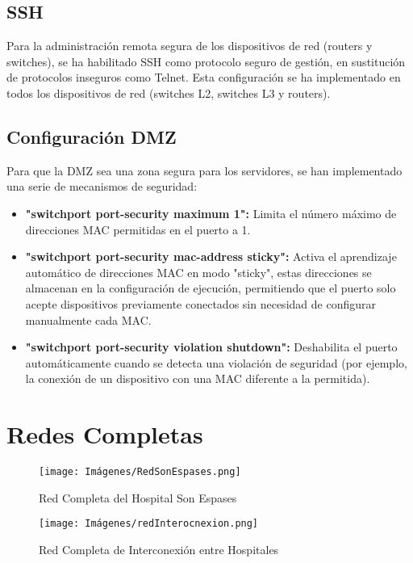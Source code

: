 \subsection{SSH}
Para la administración remota segura de los dispositivos de red (routers y switches), se ha habilitado SSH como protocolo seguro de gestión, en sustitución de protocolos inseguros como Telnet. 
Esta configuración se ha implementado en todos los dispositivos de red (switches L2, switches L3 y routers). 

\subsection{Configuración DMZ}
Para que la DMZ sea una zona segura para los servidores, se han implementado una serie de mecanismos de seguridad:
\begin{itemize}
    \item \textbf{"switchport port-security maximum 1":} Limita el número máximo de direcciones MAC permitidas en el puerto a 1.
    \item \textbf{"switchport port-security mac-address sticky":} Activa el aprendizaje automático de direcciones MAC en modo "sticky", estas direcciones se almacenan en la configuración de ejecución, permitiendo que el puerto solo acepte dispositivos previamente conectados sin necesidad de configurar manualmente cada MAC.
    \item \textbf{"switchport port-security violation shutdown":} Deshabilita el puerto automáticamente cuando se detecta una violación de seguridad (por ejemplo, la conexión de un dispositivo con una MAC diferente a la permitida).
\end{itemize}

\section{Redes Completas}

\begin{figure}[H]
    \centering
    \texttt{[image: Imágenes/RedSonEspases.png]}
    \caption{Red Completa del Hospital Son Espases}
    \label{fig:SonEspases}
\end{figure}

\begin{figure}[H]
    \centering
    \texttt{[image: Imágenes/redInterocnexion.png]}
    \caption{Red Completa de Interconexión entre Hospitales}
    \label{fig:interconexion}
\end{figure}

